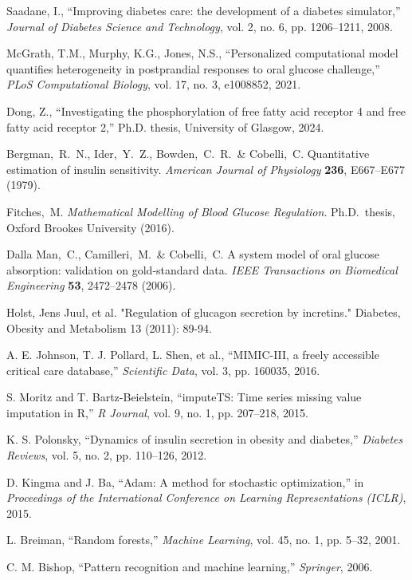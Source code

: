 \documentclass[9pt,shortpaper,twoside,web]{ieeecolor}
\begin{document}
\begin{thebibliography}{00}
Saadane, I., ``Improving diabetes care: the development of a diabetes simulator,'' \textit{Journal of Diabetes Science and Technology}, vol. 2, no. 6, pp. 1206--1211, 2008.

McGrath, T.M., Murphy, K.G., Jones, N.S., ``Personalized computational model quantifies heterogeneity in postprandial responses to oral glucose challenge,'' \textit{PLoS Computational Biology}, vol. 17, no. 3, e1008852, 2021.




Dong, Z., ``Investigating the phosphorylation of free fatty acid receptor 4 and free fatty acid receptor 2,'' Ph.D. thesis, University of Glasgow, 2024. 


Bergman,~R.~N., Ider,~Y.~Z., Bowden,~C.~R.\ \& Cobelli,~C.
Quantitative estimation of insulin sensitivity.
\textit{American Journal of Physiology} \textbf{236}, E667–E677 (1979).

Fitches,~M.
\textit{Mathematical Modelling of Blood Glucose Regulation}.
Ph.D.\ thesis, Oxford Brookes University (2016).

Dalla Man,~C., Camilleri,~M.\ \& Cobelli,~C.
A system model of oral glucose absorption: validation on gold‐standard data.
\textit{IEEE Transactions on Biomedical Engineering} \textbf{53}, 2472–2478 (2006).



Holst, Jens Juul, et al. "Regulation of glucagon secretion by incretins." Diabetes, Obesity and Metabolism 13 (2011): 89-94. 




A. E. Johnson, T. J. Pollard, L. Shen, et al., ``MIMIC-III, a freely accessible critical care database,'' \textit{Scientific Data}, vol. 3, pp. 160035, 2016.

S. Moritz and T. Bartz-Beielstein, ``imputeTS: Time series missing value imputation in R,'' \textit{R Journal}, vol. 9, no. 1, pp. 207–218, 2015.

K. S. Polonsky, ``Dynamics of insulin secretion in obesity and diabetes,'' \textit{Diabetes Reviews}, vol. 5, no. 2, pp. 110–126, 2012.

D. Kingma and J. Ba, ``Adam: A method for stochastic optimization,'' in \textit{Proceedings of the International Conference on Learning Representations (ICLR)}, 2015.

L. Breiman, ``Random forests,'' \textit{Machine Learning}, vol. 45, no. 1, pp. 5–32, 2001.

C. M. Bishop, ``Pattern recognition and machine learning,'' \textit{Springer}, 2006.

\end{thebibliography}
\end{document}
